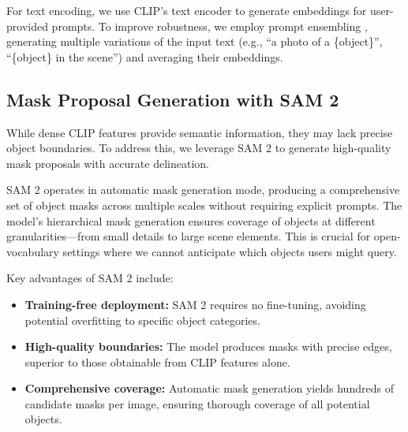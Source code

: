 For text encoding, we use CLIP's text encoder to generate embeddings for user-provided prompts. To improve robustness, we employ prompt ensembling \cite{zhou2022learning}, generating multiple variations of the input text (e.g., ``a photo of a \{object\}'', ``\{object\} in the scene'') and averaging their embeddings.

\subsection{Mask Proposal Generation with SAM 2}

While dense CLIP features provide semantic information, they may lack precise object boundaries. To address this, we leverage SAM 2 \cite{ravi2024sam2} to generate high-quality mask proposals with accurate delineation.

SAM 2 operates in automatic mask generation mode, producing a comprehensive set of object masks across multiple scales without requiring explicit prompts. The model's hierarchical mask generation ensures coverage of objects at different granularities—from small details to large scene elements. This is crucial for open-vocabulary settings where we cannot anticipate which objects users might query.

Key advantages of SAM 2 include:
\begin{itemize}
    \item \textbf{Training-free deployment:} SAM 2 requires no fine-tuning, avoiding potential overfitting to specific object categories.
    \item \textbf{High-quality boundaries:} The model produces masks with precise edges, superior to those obtainable from CLIP features alone.
    \item \textbf{Comprehensive coverage:} Automatic mask generation yields hundreds of candidate masks per image, ensuring thorough coverage of all potential objects.
\end{itemize}

